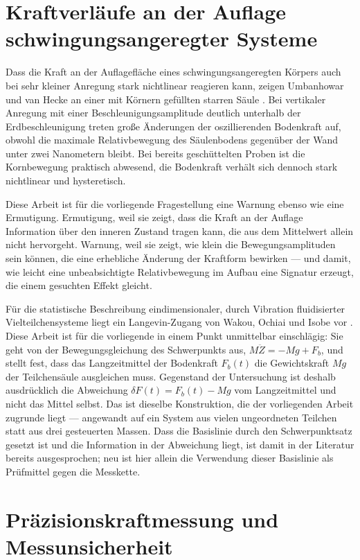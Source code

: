\documentclass[12pt,a4paper]{report}
\begin{document}
\section{Kraftverläufe an der Auflage schwingungsangeregter Systeme}

Dass die Kraft an der Auflagefläche eines schwingungsangeregten Körpers
auch bei sehr kleiner Anregung stark nichtlinear reagieren kann, zeigen
Umbanhowar und van Hecke an einer mit Körnern gefüllten starren
Säule \cite{umbanhowar2005}. Bei vertikaler Anregung mit einer
Beschleunigungsamplitude deutlich unterhalb der Erdbeschleunigung treten
große Änderungen der oszillierenden Bodenkraft auf, obwohl die maximale
Relativbewegung des Säulenbodens gegenüber der Wand unter zwei
Nanometern bleibt. Bei bereits geschüttelten Proben ist die Kornbewegung
praktisch abwesend, die Bodenkraft verhält sich dennoch stark
nichtlinear und hysteretisch.

Diese Arbeit ist für die vorliegende Fragestellung eine Warnung ebenso
wie eine Ermutigung. Ermutigung, weil sie zeigt, dass die Kraft an der
Auflage Information über den inneren Zustand tragen kann, die aus dem
Mittelwert allein nicht hervorgeht. Warnung, weil sie zeigt, wie klein
die Bewegungsamplituden sein können, die eine erhebliche Änderung der
Kraftform bewirken --- und damit, wie leicht eine unbeabsichtigte
Relativbewegung im Aufbau eine Signatur erzeugt, die einem gesuchten
Effekt gleicht.

Für die statistische Beschreibung eindimensionaler, durch Vibration
fluidisierter Vielteilchensysteme liegt ein Langevin-Zugang von Wakou,
Ochiai und Isobe vor \cite{wakou2008}. Diese Arbeit ist für die
vorliegende in einem Punkt unmittelbar einschlägig: Sie geht von der
Bewegungsgleichung des Schwerpunkts aus, $M\ddot{Z} = -Mg + F_b$, und
stellt fest, dass das Langzeitmittel der Bodenkraft $F_b(t)$ die
Gewichtskraft $Mg$ der Teilchensäule ausgleichen muss. Gegenstand der
Untersuchung ist deshalb ausdrücklich die Abweichung
$\delta F(t) = F_b(t) - Mg$ vom Langzeitmittel und nicht das Mittel
selbst. Das ist dieselbe Konstruktion, die der vorliegenden Arbeit
zugrunde liegt --- angewandt auf ein System aus vielen ungeordneten
Teilchen statt aus drei gesteuerten Massen. Dass die Basislinie durch den
Schwerpunktsatz gesetzt ist und die Information in der Abweichung liegt,
ist damit in der Literatur bereits ausgesprochen; neu ist hier allein die
Verwendung dieser Basislinie als Prüfmittel gegen die Messkette.

\section{Präzisionskraftmessung und Messunsicherheit}
\end{document}

